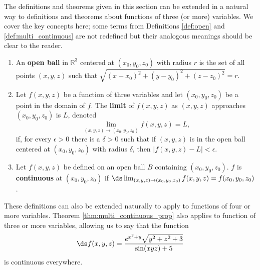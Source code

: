 The definitions and theorems given in this section can be extended in a natural way to definitions and theorems about functions of three (or more) variables. We cover the key concepts here; some terms from Definitions \ref{def:open} and \ref{def:multi_continuous} are not redefined but their analogous meanings should be clear to the reader.

\setboxwidth{20pt}
{ 
\begin{enumerate}
\item An \textbf{open ball} in $\mathbb{R}^3$ centered at $(x_0,y_0,z_0)$ with radius $r$ is the set of all points $(x,y,z)$ such that $\sqrt{(x-x_0)^2+(y-y_0)^2+(z-z_0)^2} = r$.
\\

\item Let $f(x,y,z)$ be a function of three variables and let $(x_0,y_0,z_0)$ be a point in the domain of $f$. The \textbf{limit} of $f(x,y,z)$ as $(x,y,z)$ approaches $(x_0,y_0,z_0)$ is $L$, denoted 
$$\lim_{(x,y,z)\to (x_0,y_0,z_0)} f(x,y,z) = L,$$
if, for every $\epsilon >0$ there is a $\delta >0$ such that if $(x,y,z)$ is in the open ball centered at $(x_0,y_0,z_0)$ with radius $\delta$, then $|f(x,y,z) - L|< \epsilon$.\\

\item Let $f(x,y,z)$ be defined on an open ball $B$ containing $(x_0,y_0,z_0)$. $f$ is \textbf{continuous} at $(x_0,y_0,z_0)$ if $\ds \lim_{(x,y,z)\to (x_0,y_0,z_0)} f(x,y,z) = f(x_0,y_0,z_0)$.
\end{enumerate}
}
\restoreboxwidth

These definitions can also be extended naturally to apply to functions of four or more variables. Theorem \ref{thm:multi_continuous_prop} also applies to function of three or more variables, allowing us to say that the function $$\ds f(x,y,z) = \frac{e^{x^2+y}\sqrt{y^2+z^2+3}}{\sin (xyz)+5}$$ is continuous everywhere.


